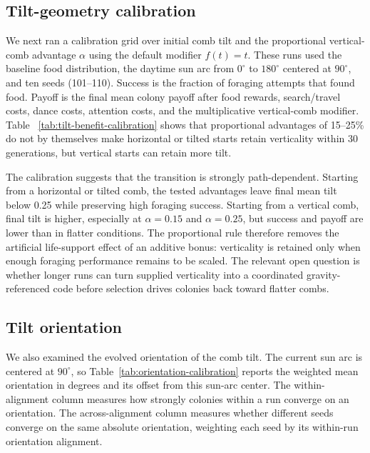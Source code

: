 \documentclass[11pt]{article}
\begin{document}
\subsection{Tilt-geometry calibration}

We next ran a calibration grid over initial comb tilt and the proportional
vertical-comb advantage $\alpha$ using the default modifier $f(t)=t$. These
runs used the baseline food distribution, the daytime sun arc from $0^\circ$
to $180^\circ$ centered at $90^\circ$, and ten seeds (101--110). Success is
the fraction of foraging attempts that found food. Payoff is the final mean
colony payoff after food rewards, search/travel costs, dance costs, attention
costs, and the multiplicative vertical-comb modifier. Table~
\ref{tab:tilt-benefit-calibration} shows that proportional advantages of
15--25\% do not by themselves make horizontal or tilted starts retain
verticality within 30 generations, but vertical starts can retain more tilt.



The calibration suggests that the transition is strongly path-dependent.
Starting from a horizontal or tilted comb, the tested advantages leave final
mean tilt below 0.25 while preserving high foraging success. Starting from a
vertical comb, final tilt is higher, especially at $\alpha=0.15$ and
$\alpha=0.25$, but success and payoff are lower than in flatter conditions.
The proportional rule therefore removes the artificial life-support effect of
an additive bonus: verticality is retained only when enough foraging
performance remains to be scaled. The relevant open question is whether
longer runs can turn supplied verticality into a coordinated gravity-referenced
code before selection drives colonies back toward flatter combs.

\subsection{Tilt orientation}

We also examined the evolved orientation of the comb tilt. The current sun arc
is centered at $90^\circ$, so Table~\ref{tab:orientation-calibration} reports
the weighted mean orientation in degrees and its offset from this sun-arc
center. The within-alignment column measures how strongly colonies within a run
converge on an orientation. The across-alignment column measures whether
different seeds converge on the same absolute orientation, weighting each seed
by its within-run orientation alignment.
\end{document}
